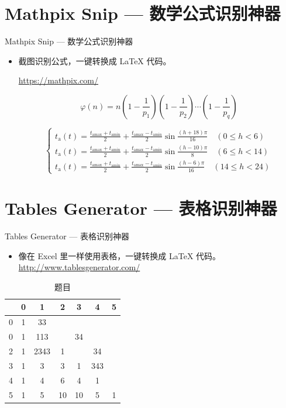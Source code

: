 \documentclass[13pt]{ctexbeamer}
\begin{document}
\section{Mathpix Snip --- 数学公式识别神器}
\begin{frame}{Mathpix Snip --- 数学公式识别神器}
\begin{itemize}
	\item 截图识别公式，一键转换成 LaTeX 代码。

\href{https://mathpix.com/}{https://mathpix.com/}



$$
\varphi(n)=n\left(1-\frac{1}{p_{1}}\right)\left(1-\frac{1}{p_{2}}\right) \cdots\left(1-\frac{1}{p_{q}}\right)
$$

$$
\left\{\begin{array}{l}
    t_{\mathrm{a}}(t)=\frac{t_{\mathrm{amax}}+t_{\mathrm{amin}}}{2}+\frac{t_{\mathrm{amax}}-t_{\mathrm{amin}}}{2} \sin \frac{(h+18) \pi}{16} \quad(0 \leqslant h<6) \\
    t_{\mathrm{a}}(t)=\frac{t_{\mathrm{amax}}+t_{\mathrm{amin}}}{2}+\frac{t_{\mathrm{amax}}-t_{\mathrm{amin}}}{2} \sin \frac{(h-10) \pi}{8} \quad(6 \leqslant h<14) \\
    t_{\mathrm{a}}(t)=\frac{t_{\mathrm{amax}}+t_{\mathrm{amin}}}{2}+\frac{t_{\mathrm{amax}}-t_{\mathrm{amin}}}{2} \sin \frac{(h-6) \pi}{16} \quad(14 \leqslant h<24)
\end{array}\right.
$$

\end{itemize}
\end{frame}


\section{Tables Generator --- 表格识别神器 }
\begin{frame}{Tables Generator  --- 表格识别神器 }
\begin{itemize}
	\item 	 像在 Excel 里一样使用表格，一键转换成 LaTeX 代码。
	\href{ http://www.tablesgenerator.com/}{ http://www.tablesgenerator.com/}

\end{itemize}
\begin{table}[]
    \caption{题目}
    \centering
    \begin{tabular}{|c|c|c|c|c|c|c|}
        \hline
        & 0 & 1    & 2  & 3  & 4   & 5 \\ \hline
        0 & 1 & 33   &    &    &     &   \\ \hline
        0 & 1 & 113  &    & 34 &     &   \\ \hline
        2 & 1 & 2343 & 1  &    & 34  &   \\ \hline
        3 & 1 & 3    & 3  & 1  & 343 &   \\ \hline
        4 & 1 & 4    & 6  & 4  & 1   &   \\ \hline
        5 & 1 & 5    & 10 & 10 & 5   & 1 \\ \hline
    \end{tabular}
\end{table}


\end{frame}
\end{document}
